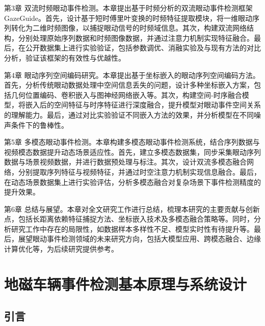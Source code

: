 \documentclass{xdupgthesis}
\makeatletter
\newcommand{\ModelMM}{GazeGuide}
\newcommand{\Fs}{\ensuremath{50\,\mathrm{Hz}}}
\newcommand{\MagUnit}{\ensuremath{\mathrm{nT}}}
\newcommand{\SmoothLen}{\ensuremath{7}}        %
\newcommand{\BgWinPts}{\ensuremath{500}}       %
\newcommand{\ProbFloor}{\ensuremath{10^{-6}}}  %
\providecommand{\FloatBarrier}{}
\makeatother
\begin{document}
第3章 双流时频眼动事件检测。本章提出基于时频分析的双流眼动事件检测框架\ModelMM{}。首先，设计基于短时傅里叶变换的时频特征提取模块，将一维眼动序列转化为二维时频图像，以捕捉眼动信号的时频域信息。其次，构建双流网络结构，分别处理原始序列数据和时频图像数据，并通过注意力机制实现特征融合。最后，在公开数据集上进行实验验证，包括参数调优、消融实验及与现有方法的对比分析，验证该框架的有效性与优越性。


第4章 眼动序列空间编码研究。本章提出基于坐标嵌入的眼动序列空间编码方法。首先，分析传统眼动数据处理中空间信息丢失的问题，设计多种坐标嵌入方案，包括几何位置编码、卷积嵌入与图神经网络嵌入等。其次，构建空间-时序融合模型，将嵌入后的空间特征与时序特征进行深度融合，提升模型对眼动事件空间关系的理解能力。最后，通过对比实验验证不同嵌入方法的效果，并分析模型在不同噪声条件下的鲁棒性。

第5章 多模态眼动事件检测。本章构建多模态眼动事件检测系统，结合序列数据与视频模态数据提升动态场景适应性。首先，建立多模态数据集，同步采集眼动序列数据与场景视频数据，并进行数据预处理与标注。其次，设计双流多模态融合网络，分别提取序列特征与视频特征，并通过时空注意力机制实现信息融合。最后，在动态场景数据集上进行实验评估，分析多模态融合对复杂场景下事件检测精度的提升效果。

第6章 总结与展望。本章对全文研究工作进行总结，梳理本研究的主要贡献与创新点，包括长距离依赖特征捕捉方法、坐标嵌入技术及多模态融合策略等。同时，分析研究工作中存在的局限性，如数据样本多样性不足、模型实时性有待提升等。最后，展望眼动事件检测领域的未来研究方向，包括大模型应用、跨模态融合、边缘计算优化等，为后续研究提供参考。







\chapter{地磁车辆事件检测基本原理与系统设计}
\label{ch:ch2_event_detect}

\section{引言}\label{sec:ch2_intro}
\end{document}
